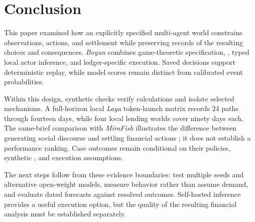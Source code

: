 \section{Conclusion}\label{sec:conclusion}
This paper examined how an explicitly specified multi-agent world constrains
 observations, actions, and settlement while preserving records of the
resulting choices and consequences.  \textit{Boyun} combines game-theoretic
specification, , typed local actor inference, and
ledger-specific execution. Saved decisions support deterministic replay,
while model scores remain distinct from calibrated event probabilities.

Within this design, synthetic checks verify calculations and isolate selected
mechanisms. A full-horizon local \textit{Laya} token-launch matrix records
24 paths  through fourteen days, while four local lending worlds cover ninety
days each. The same-brief comparison with \textit{MiroFish} illustrates the
difference between generating social discourse and settling financial actions ;
it does not establish a performance ranking. Case outcomes remain conditional
on their policies, synthetic , and execution assumptions.

The next steps follow from these evidence boundaries: test multiple seeds and
alternative open-weight models, measure behavior rather than assume demand,
and evaluate dated forecasts against resolved outcomes. Self-hosted inference
provides a useful execution option, but the quality of the resulting financial
analysis must be established separately.
